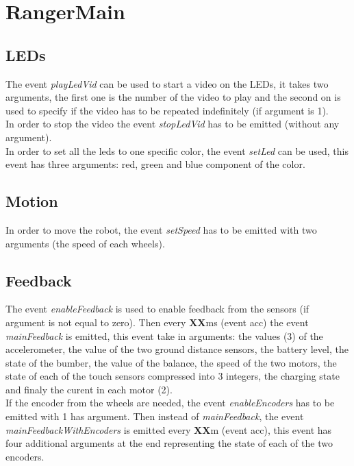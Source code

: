 \documentclass[a4paper,11pt]{report}
\begin{document}
\section{RangerMain}
\subsection{LEDs}
The event \textit{playLedVid} can be used to start a video on the LEDs, it takes two arguments, the first one is the number of the video to play and the second on is used to specify if the video has to be repeated indefinitely (if argument is 1).\\

In order to stop the video the event \textit{stopLedVid} has to be emitted (without any argument).\\

In order to set all the leds to one specific color, the event \textit{setLed} can be used, this event has three arguments: red, green and blue component of the color.\\

\subsection{Motion}

In order to move the robot, the event \textit{setSpeed} has to be emitted with two arguments (the speed of each wheels).\\

\newpage
\subsection{Feedback}

The event \textit{enableFeedback} is used to enable feedback from the sensors (if argument is not equal to zero). Then every \textbf{XX}ms (event acc) the event \textit{mainFeedback} is emitted, this event take in arguments: the values (3) of the accelerometer, the value of the two ground distance sensors, the battery level, the state of the bumber, the value of the balance, the speed of the two motors, the state of each of the touch sensors compressed into 3 integers, the charging state and finaly the curent in each motor (2).\\

If the encoder from the wheels are needed, the event \textit{enableEncoders} has to be emitted with 1 has argument. Then instead of  \textit{mainFeedback}, the event  \textit{mainFeedbackWithEncoders} is emitted every \textbf{XX}m (event acc), this event has four additional arguments at the end representing the state of each of the two encoders.\\
\end{document}
